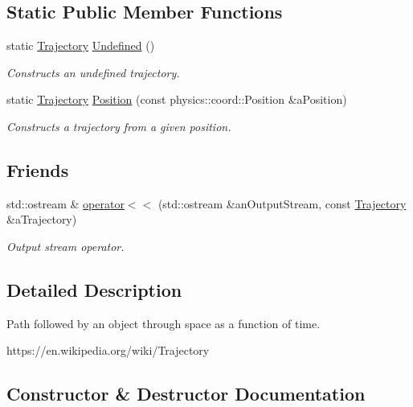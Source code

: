\subsection*{Static Public Member Functions}
\begin{DoxyCompactItemize}
\item 
static \hyperlink{classlibrary_1_1astro_1_1_trajectory}{Trajectory} \hyperlink{classlibrary_1_1astro_1_1_trajectory_a0a8685cabc646fcc5b7f046a606ae967}{Undefined} ()
\begin{DoxyCompactList}\small\item\em Constructs an undefined trajectory. \end{DoxyCompactList}\item 
static \hyperlink{classlibrary_1_1astro_1_1_trajectory}{Trajectory} \hyperlink{classlibrary_1_1astro_1_1_trajectory_a39e9a50f84016cb53ca36d61809dc058}{Position} (const physics\+::coord\+::\+Position \&a\+Position)
\begin{DoxyCompactList}\small\item\em Constructs a trajectory from a given position. \end{DoxyCompactList}\end{DoxyCompactItemize}
\subsection*{Friends}
\begin{DoxyCompactItemize}
\item 
std\+::ostream \& \hyperlink{classlibrary_1_1astro_1_1_trajectory_aef0327f0240dc2d71eca34dc287f88ea}{operator$<$$<$} (std\+::ostream \&an\+Output\+Stream, const \hyperlink{classlibrary_1_1astro_1_1_trajectory}{Trajectory} \&a\+Trajectory)
\begin{DoxyCompactList}\small\item\em Output stream operator. \end{DoxyCompactList}\end{DoxyCompactItemize}


\subsection{Detailed Description}
Path followed by an object through space as a function of time. 

https\+://en.wikipedia.\+org/wiki/\+Trajectory 

\subsection{Constructor \& Destructor Documentation}
\mbox{\label{classlibrary_1_1astro_1_1_trajectory_a8e5c7740915ca947e067c0f419ac1c65}} 
